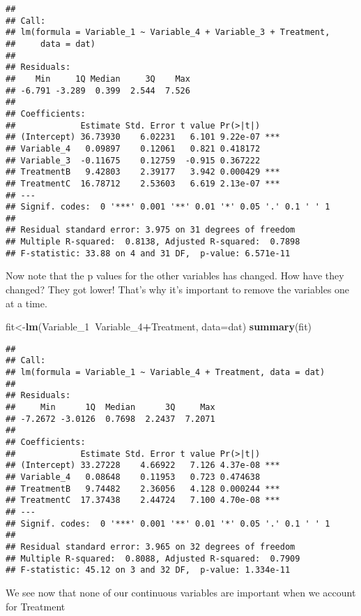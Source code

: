 \documentclass[
]{article}
\newenvironment{Shaded}{\begin{snugshade}}{\end{snugshade}}
\newcommand{\DataTypeTok}[1]{\textcolor[rgb]{0.13,0.29,0.53}{#1}}
\newcommand{\DecValTok}[1]{\textcolor[rgb]{0.00,0.00,0.81}{#1}}
\newcommand{\KeywordTok}[1]{\textcolor[rgb]{0.13,0.29,0.53}{\textbf{#1}}}
\newcommand{\NormalTok}[1]{#1}
\newcommand{\OperatorTok}[1]{\textcolor[rgb]{0.81,0.36,0.00}{\textbf{#1}}}
\begin{document}
\begin{verbatim}
## 
## Call:
## lm(formula = Variable_1 ~ Variable_4 + Variable_3 + Treatment, 
##     data = dat)
## 
## Residuals:
##    Min     1Q Median     3Q    Max 
## -6.791 -3.289  0.399  2.544  7.526 
## 
## Coefficients:
##             Estimate Std. Error t value Pr(>|t|)    
## (Intercept) 36.73930    6.02231   6.101 9.22e-07 ***
## Variable_4   0.09897    0.12061   0.821 0.418172    
## Variable_3  -0.11675    0.12759  -0.915 0.367222    
## TreatmentB   9.42803    2.39177   3.942 0.000429 ***
## TreatmentC  16.78712    2.53603   6.619 2.13e-07 ***
## ---
## Signif. codes:  0 '***' 0.001 '**' 0.01 '*' 0.05 '.' 0.1 ' ' 1
## 
## Residual standard error: 3.975 on 31 degrees of freedom
## Multiple R-squared:  0.8138, Adjusted R-squared:  0.7898 
## F-statistic: 33.88 on 4 and 31 DF,  p-value: 6.571e-11
\end{verbatim}

Now note that the p values for the other variables has changed. How have
they changed? They got lower! That's why it's important to remove the
variables one at a time.

\begin{Shaded}
\begin{Highlighting}[]
\NormalTok{fit<-}\KeywordTok{lm}\NormalTok{(Variable_}\DecValTok{1}\OperatorTok{~}\NormalTok{Variable_}\DecValTok{4}\OperatorTok{+}\NormalTok{Treatment, }\DataTypeTok{data=}\NormalTok{dat)}
\KeywordTok{summary}\NormalTok{(fit)}
\end{Highlighting}
\end{Shaded}

\begin{verbatim}
## 
## Call:
## lm(formula = Variable_1 ~ Variable_4 + Treatment, data = dat)
## 
## Residuals:
##     Min      1Q  Median      3Q     Max 
## -7.2672 -3.0126  0.7698  2.2437  7.2071 
## 
## Coefficients:
##             Estimate Std. Error t value Pr(>|t|)    
## (Intercept) 33.27228    4.66922   7.126 4.37e-08 ***
## Variable_4   0.08648    0.11953   0.723 0.474638    
## TreatmentB   9.74482    2.36056   4.128 0.000244 ***
## TreatmentC  17.37438    2.44724   7.100 4.70e-08 ***
## ---
## Signif. codes:  0 '***' 0.001 '**' 0.01 '*' 0.05 '.' 0.1 ' ' 1
## 
## Residual standard error: 3.965 on 32 degrees of freedom
## Multiple R-squared:  0.8088, Adjusted R-squared:  0.7909 
## F-statistic: 45.12 on 3 and 32 DF,  p-value: 1.334e-11
\end{verbatim}

We see now that none of our continuous variables are important when we
account for Treatment
\end{document}
